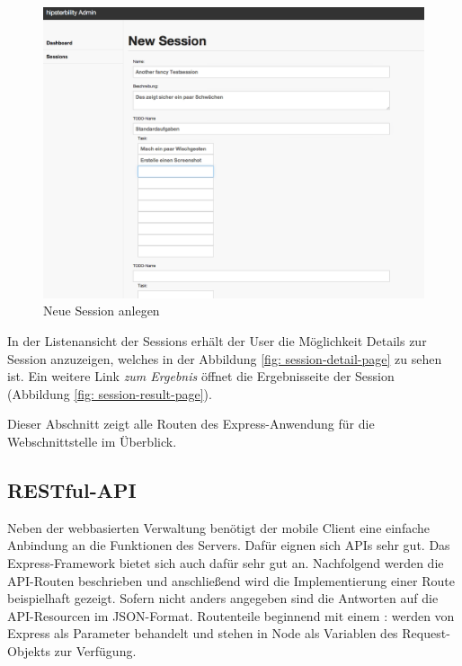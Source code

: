 \begin{figure}[h!]
	\centering
		\includegraphics[width=\linewidth,keepaspectratio]{img/session-create-page.png}
	\caption{Neue Session anlegen}
	\label{fig: session-create-page}
\end{figure}

In der Listenansicht der Sessions erhält der User die Möglichkeit Details zur Session anzuzeigen, welches in der Abbildung \ref{fig: session-detail-page} zu sehen ist. Ein weitere Link \emph{zum Ergebnis} öffnet die Ergebnisseite der Session (Abbildung \ref{fig: session-result-page}).




Dieser Abschnitt zeigt alle Routen des Express-Anwendung für die Webschnittstelle im Überblick. 

\subsection{RESTful-API \label{sec: api}}

Neben der webbasierten Verwaltung benötigt der mobile Client eine einfache Anbindung an die Funktionen des Servers. Dafür eignen sich APIs sehr gut. Das Express-Framework bietet sich auch dafür sehr gut an. Nachfolgend werden die API-Routen beschrieben und anschließend wird die Implementierung einer Route beispielhaft gezeigt. Sofern nicht anders angegeben sind die Antworten auf die API-Resourcen im JSON-Format. Routenteile beginnend mit einem : werden von Express als Parameter behandelt und stehen in Node als Variablen des Request-Objekts zur Verfügung. 

